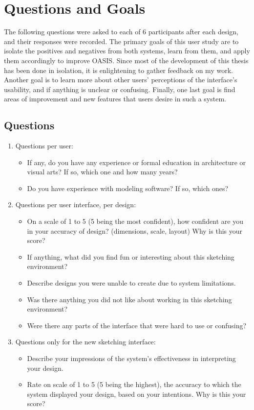 \section{Questions and Goals}
The following questions were asked to each of 6 participants after each design, and their responses were recorded. The primary goals of this user study are to isolate the positives and negatives from both systems, learn from them, and apply them accordingly to improve OASIS. Since most of the development of this thesis has been done in isolation, it is enlightening to gather feedback on my work. Another goal is to learn more about other users' perceptions of the interface's usability, and if anything is unclear or confusing. Finally, one last goal is find areas of improvement and new features that users desire in such a system.

\subsection{Questions}
\begin{enumerate}
\item Questions per user:
\begin{itemize}
    \item If any, do you have any experience or formal education in architecture or visual arts? If so, which one and how many years?
    \item Do you have experience with modeling software? If so, which ones?
\end{itemize}
\item Questions per user interface, per design:
\begin{itemize}
    \item On a scale of 1 to 5 (5 being the most confident), how confident are you in your accuracy of design? (dimensions, scale, layout) Why is this your score?
    \item If anything, what did you find fun or interesting about this sketching environment?
    \item Describe designs you were unable to create due to system limitations.
    \item Was there anything you did not like about working in this sketching environment?
    \item Were there any parts of the interface that were hard to use or confusing?
\end{itemize}
\item Questions only for the new sketching interface:
\begin{itemize}
    \item Describe your impressions of the system’s effectiveness in interpreting your design.
    \item Rate on scale of 1 to 5 (5 being the highest), the accuracy to which the system displayed your design, based on your intentions. Why is this your score?
\end{itemize}
\end{enumerate}

